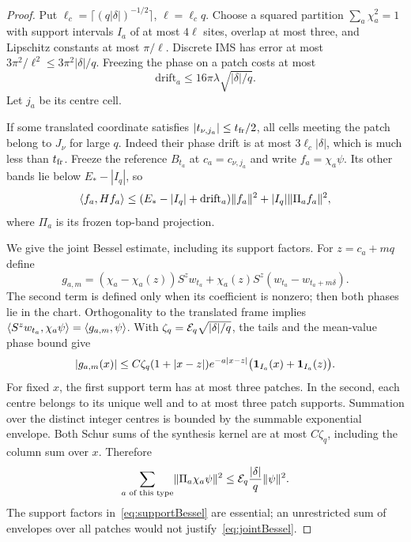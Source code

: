 \begin{proof}
Put $\ell_c=\lceil(q|\delta|)^{-1/2}\rceil$, $\ell=\ell_cq$. Choose a squared partition $\sum_a\chi_a^2=1$ with support intervals $I_a$ of at most $4\ell$ sites, overlap at most three, and Lipschitz constants at most $\pi/\ell$. Discrete IMS has error at most $3\pi^2/\ell^2\le3\pi^2|\delta|/q$. Freezing the phase on a patch costs at most
\[
 \mathrm{drift}_a\le16\pi\lambda\sqrt{|\delta|/q}.
\]
Let $j_a$ be its centre cell.

If some translated coordinate satisfies $|t_{\nu,j_a}|\le t_{\rm fr}/2$, all cells meeting the patch belong to $J_\nu$ for large $q$. Indeed their phase drift is at most $3\ell_c|\delta|$, which is much less than $t_{\rm fr}$. Freeze the reference $B_{t_a}$ at $c_a=c_{\nu,j_a}$ and write $f_a=\chi_a\psi$. Its other bands lie below $E_*-|I_q|$, so
\begin{equation}\label{eq:localcomplement}
 \langle f_a,Hf_a\rangle\le(E_*-|I_q|+\mathrm{drift}_a)\lVert f_a\rVert^2
                   +|I_q|\lVert \Pi_af_a\rVert^2,
\end{equation}
where $\Pi_a$ is its frozen top-band projection.

We give the joint Bessel estimate, including its support factors. For $z=c_a+mq$ define
\[
 g_{a,m}=(\chi_a-\chi_a(z))S^zw_{t_a}
       +\chi_a(z)S^z(w_{t_a}-w_{t_a+m\delta}).
\]
The second term is defined only when its coefficient is nonzero; then both phases lie in the chart. Orthogonality to the translated frame implies
$\langle S^zw_{t_a},\chi_a\psi\rangle=\langle g_{a,m},\psi\rangle$. With $\zeta_q=\mathcal E_q\sqrt{|\delta|/q}$, the tails and the mean-value phase bound give
\begin{equation}\label{eq:supportBessel}
 |g_{a,m}(x)|\le C\zeta_q(1+|x-z|)e^{-a|x-z|}
       \bigl(\mathbf 1_{I_a}(x)+\mathbf 1_{I_a}(z)\bigr).
\end{equation}
For fixed $x$, the first support term has at most three patches. In the second, each centre belongs to its unique well and to at most three patch supports. Summation over the distinct integer centres is bounded by the summable exponential envelope. Both Schur sums of the synthesis kernel are at most $C\zeta_q$, including the column sum over $x$. Therefore
\begin{equation}\label{eq:jointBessel}
 \sum_{a\text{ of this type}}\lVert \Pi_a\chi_a\psi\rVert^2
 \le\mathcal E_q\frac{|\delta|}{q}\lVert \psi\rVert^2.
\end{equation}
The support factors in~\eqref{eq:supportBessel} are essential; an unrestricted sum of envelopes over all patches would not justify~\eqref{eq:jointBessel}.


\end{proof}

